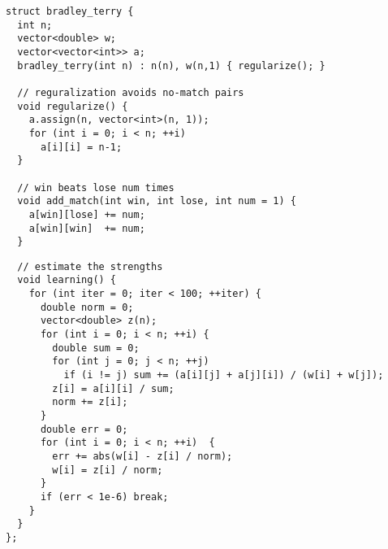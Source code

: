 \begin{center}
\begin{minipage}[t]{0.45\linewidth}
\begin{lstlisting}
struct bradley_terry {
  int n;
  vector<double> w;
  vector<vector<int>> a;
  bradley_terry(int n) : n(n), w(n,1) { regularize(); }

  // reguralization avoids no-match pairs
  void regularize() {
    a.assign(n, vector<int>(n, 1));
    for (int i = 0; i < n; ++i)
      a[i][i] = n-1;
  }

  // win beats lose num times
  void add_match(int win, int lose, int num = 1) {
    a[win][lose] += num;
    a[win][win]  += num;
  }
\end{lstlisting}
\end{minipage}
\qquad
\begin{minipage}[t]{0.5\linewidth}
\begin{lstlisting}
  // estimate the strengths
  void learning() {
    for (int iter = 0; iter < 100; ++iter) {
      double norm = 0;
      vector<double> z(n);
      for (int i = 0; i < n; ++i) {
        double sum = 0;
        for (int j = 0; j < n; ++j) 
          if (i != j) sum += (a[i][j] + a[j][i]) / (w[i] + w[j]);
        z[i] = a[i][i] / sum;
        norm += z[i];
      }
      double err = 0;
      for (int i = 0; i < n; ++i)  {
        err += abs(w[i] - z[i] / norm);
        w[i] = z[i] / norm;
      }
      if (err < 1e-6) break;
    }
  }
};
\end{lstlisting}
\end{minipage}
\end{center}